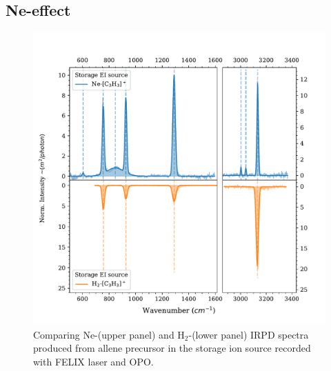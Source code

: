 \subsection{Ne-effect}
\vspace{0.5cm}
\begin{figure}
	\centering
	
		\includegraphics[scale=.7]{chapters/C3H3+ and C3D3+/figures/compare_ligands.pdf}
	\caption{Comparing Ne-\iso (upper panel) and H$_2$-\iso (lower panel) IRPD spectra produced from allene precursor in the storage ion source recorded with FELIX laser and OPO. }
	\label{FIG:compare_ligands}
\end{figure}


